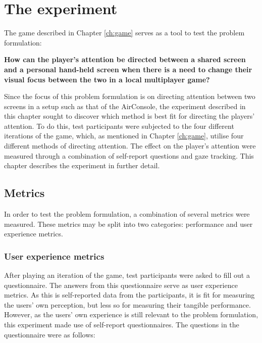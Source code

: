 \chapter{The experiment}\label{ch:experiment}
The game described in Chapter \ref{ch:game} serves as a tool to test the problem formulation:

\begin{changemargin}{1cm}{1cm}
\textbf{How can the player’s attention be directed between a shared screen and a personal hand-held screen when there is a need to change their visual focus between the two in a local multiplayer game?}
\end{changemargin}

Since the focus of this problem formulation is on directing attention between two screens in a setup such as that of the AirConsole, the experiment described in this chapter sought to discover which method is best fit for directing the players' attention. To do this, test participants were subjected to the four different iterations of the game, which, as mentioned in Chapter \ref{ch:game}, utilise four different methods of directing attention. The effect on the player's attention were measured through a combination of self-report questions and gaze tracking. This chapter describes the experiment in further detail.

\section{Metrics}
In order to test the problem formulation, a combination of several metrics were measured. These metrics may be split into two categories: performance and user experience metrics.

\subsection{User experience metrics}\label{subsec:user_experience_metrics}
After playing an iteration of the game, test participants were asked to fill out a questionnaire. The answers from this questionnaire serve as user experience metrics. As this is self-reported data from the participants, it is fit for measuring the users' own perception, but less so for measuring their tangible performance. However, as the users' own experience is still relevant to the problem formulation, this experiment made use of self-report questionnaires. The questions in the questionnaire were as follows:

